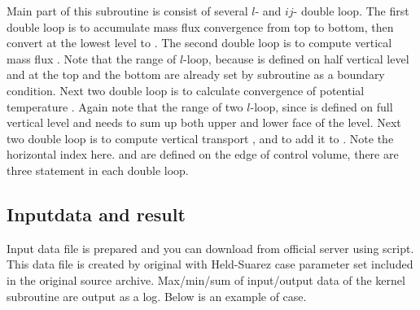 Main part of this subroutine is consist of several $l$- and $ij$- double loop.
%
The first double loop is to accumulate mass flux convergence from top to bottom,
then convert  at the lowest level to .
%
The second double loop is to compute vertical mass flux .
%
Note that the range of $l$-loop, because  is defined on half
vertical level and at the top and the bottom are already set by
subroutine  as a boundary condition.
%
Next two double loop is to calculate convergence of potential
temperature .
%
Again note that the range of two $l$-loop, since  is
defined on full vertical level and needs to sum up both upper and lower
face of the level.
%
Next two double loop is to compute vertical transport , and to
add it to .
%
Note the horizontal index here.
%
 and  are defined on the edge
of control volume, there are three statement in each double loop.

\clearpage



\subsection{Inputdata and result}

Input data file is prepared and you can download from official server using
 script.
%
This data file is created by original \DYNAMICO\footnotemark with
Held-Suarez case parameter set included in the original source archive.
%
%
Max/min/sum of input/output data of the kernel subroutine are output as
a log.
%
Below is an example of  case.

